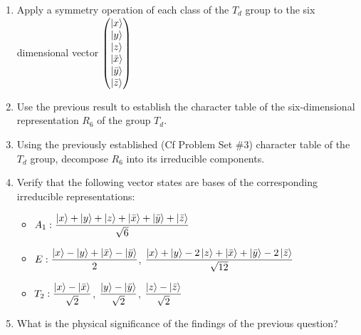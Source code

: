 \begin{enumerate}[label=(\roman*)]
\item Apply a symmetry operation of each class of the $T_d$ group to the six
  dimensional vector $\begin{pmatrix}
\left| x \right>\\ 
\left| y \right>\\
\left| z \right>\\
\left| \bar{x} \right>\\
\left| \bar{y} \right>\\
\left| \bar{z} \right>
\end{pmatrix}$
\item Use the previous result to establish the character table of the
  six-dimensional representation $R_6$ of the group $T_d$.
\item Using the previously established (Cf Problem Set \#3) character
  table of the $T_d$ group, decompose $R_6$ into its irreducible
  components.
\item Verify that the following vector states are bases of the
  corresponding irreducible representations:
  \begin {itemize}
  \item $A_1: \dfrac{\left| x \right> + \left| y \right> + \left| z \right> + \left| \bar{x} \right> +
      \left| \bar{y} \right> + \left| \bar{z} \right>}{\sqrt{6}} $
  \item $E: \dfrac{\left| x \right> - \left| y \right> + \left| \bar{x} \right> -
      \left| \bar{y} \right>}{2}$, $\dfrac{\left| x \right> + \left| y \right> -2 \left| z \right> + \left| \bar{x} \right> +
      \left| \bar{y} \right> -2 \left| \bar{z} \right>}{\sqrt{12}}$
  \item $T_2: \dfrac{\left| x \right> - \left| \bar{x} \right>}{\sqrt{2}}$,
    $\dfrac{\left| y \right> - \left| \bar{y} \right>}{\sqrt{2}}$, $\dfrac{\left| z \right> - \left| \bar{z} \right>}{\sqrt{2}}$
  \end{itemize}
\item What is the physical significance of the findings of the
  previous question?
\end{enumerate}




